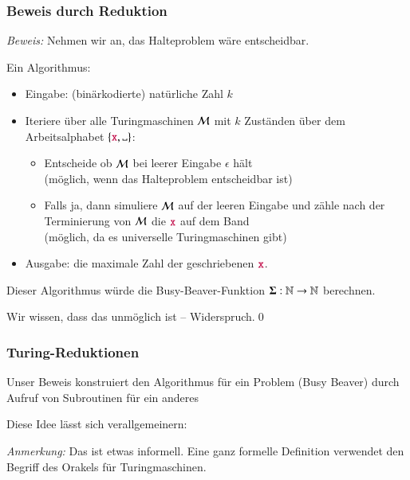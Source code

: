 \documentclass[aspectratio=1610,onlymath]{beamer}
\begin{document}
\begin{frame}[t]\frametitle{Beweis durch Reduktion\phantom{"`T"'}}

\pause

\emph{Beweis:} Nehmen wir an, das Halteproblem wäre entscheidbar.\medskip\pause

Ein Algorithmus:
\begin{itemize}
\item Eingabe: (binärkodierte) natürliche Zahl $k$
\item Iteriere über alle Turingmaschinen $\mathcal{M}$ mit $k$ Zuständen über dem Arbeitsalphabet $\{\Sterm{x},\blank\}$:
\begin{itemize}
\item Entscheide ob $\mathcal{M}$ bei leerer Eingabe $\epsilon$ hält\\
{\footnotesize\textcolor{devilscss}{(möglich, wenn das Halteproblem entscheidbar ist)}}
\item Falls ja, dann simuliere $\mathcal{M}$ auf der leeren Eingabe und zähle
		nach der Terminierung von $\mathcal{M}$ die $\mathtt{\textcolor{purple}{x}}$ auf dem Band\\
{\footnotesize\textcolor{devilscss}{(möglich, da es universelle Turingmaschinen gibt)}}
\end{itemize}
\item Ausgabe: die maximale Zahl der geschriebenen $\mathtt{\textcolor{purple}{x}}$.
\end{itemize}\pause
Dieser Algorithmus würde die Busy-Beaver-Funktion $\boldsymbol{\Sigma}:\mathbb{N}\to\mathbb{N}$
berechnen.\medskip

Wir wissen, dass das unmöglich ist -- Widerspruch.\qed

\end{frame}

\begin{frame}\frametitle{Turing-Reduktionen}

Unser Beweis konstruiert den Algorithmus für ein Problem (Busy Beaver)
durch Aufruf von Subroutinen für ein anderes 
\bigskip\pause

Diese Idee lässt sich verallgemeinern:


{\footnotesize
\emph{Anmerkung:} Das ist etwas informell. Eine ganz formelle Definition verwendet den Begriff des \alert{Orakels} für Turingmaschinen.
}\medskip\pause


\end{frame}
\end{document}
